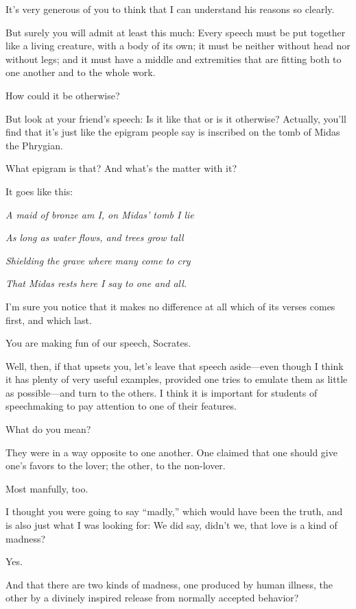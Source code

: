 \sayphaedrus It's very generous of you to think that I can understand his reasons so clearly.

\saysocrates But surely you will admit at least this much: Every speech
must be put together like a living creature, with a body of its own; it
must be neither without head nor without legs; and it must have a middle
and extremities that are fitting both to one another and to the whole
work.

\sayphaedrus How could it be otherwise?

\saysocrates But look at your friend's speech: Is it like that or is it
otherwise? Actually, you'll find that it's just like the epigram people
say is inscribed on the tomb of Midas the Phrygian.

\sayphaedrus What epigram is that? And what's the matter with it?

\saysocrates It goes like this:\crlf
\crlf

{\em A maid of bronze am I, on Midas' tomb I lie}

{\em As long as water flows, and trees grow tall}

{\em Shielding the grave where many come to cry}

{\em That Midas rests here I say to one and all.}\crlf
\crlf

I'm sure you notice that it makes no difference at all which of its
verses comes first, and which last.

\sayphaedrus You are making fun of our speech, Socrates.

\saysocrates Well, then, if that upsets you, let's leave that speech
aside---even though I think it has plenty of very useful examples,
provided one tries to emulate them as little as possible---and turn to
the others. I think it is important for students of speechmaking to pay
attention to one of their features.

\sayphaedrus What do you mean?

\saysocrates They were in a way opposite to one another. One claimed that
one should give one's favors to the lover; the other, to the non-lover.

\sayphaedrus Most manfully, too.

\saysocrates I thought you were going to say “madly,” which would have been
the truth, and is also just what I was looking for: We did say, didn't
we, that love is a kind of madness?

\sayphaedrus Yes.

\saysocrates And that there are two kinds of madness, one produced by human
illness, the other by a divinely inspired release from normally accepted
behavior?

